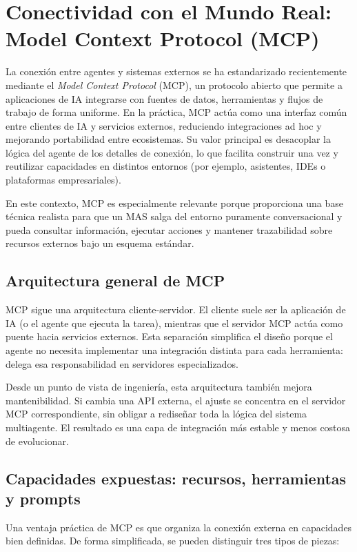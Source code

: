 \documentclass[12pt,a4paper]{article}
\begin{document}
\section{Conectividad con el Mundo Real: Model Context Protocol (MCP)}

La conexión entre agentes y sistemas externos se ha estandarizado recientemente mediante el \textit{Model Context Protocol} (MCP), un protocolo abierto que permite a aplicaciones de IA integrarse con fuentes de datos, herramientas y flujos de trabajo de forma uniforme. En la práctica, MCP actúa como una interfaz común entre clientes de IA y servicios externos, reduciendo integraciones ad hoc y mejorando portabilidad entre ecosistemas. Su valor principal es desacoplar la lógica del agente de los detalles de conexión, lo que facilita construir una vez y reutilizar capacidades en distintos entornos (por ejemplo, asistentes, IDEs o plataformas empresariales).

En este contexto, MCP es especialmente relevante porque proporciona una base técnica realista para que un MAS salga del entorno puramente conversacional y pueda consultar información, ejecutar acciones y mantener trazabilidad sobre recursos externos bajo un esquema estándar.

\subsection{Arquitectura general de MCP}

MCP sigue una arquitectura cliente-servidor. El cliente suele ser la aplicación de IA (o el agente que ejecuta la tarea), mientras que el servidor MCP actúa como puente hacia servicios externos. Esta separación simplifica el diseño porque el agente no necesita implementar una integración distinta para cada herramienta: delega esa responsabilidad en servidores especializados.

Desde un punto de vista de ingeniería, esta arquitectura también mejora mantenibilidad. Si cambia una API externa, el ajuste se concentra en el servidor MCP correspondiente, sin obligar a rediseñar toda la lógica del sistema multiagente. El resultado es una capa de integración más estable y menos costosa de evolucionar.

\subsection{Capacidades expuestas: recursos, herramientas y prompts}

Una ventaja práctica de MCP es que organiza la conexión externa en capacidades bien definidas. De forma simplificada, se pueden distinguir tres tipos de piezas:
\end{document}
